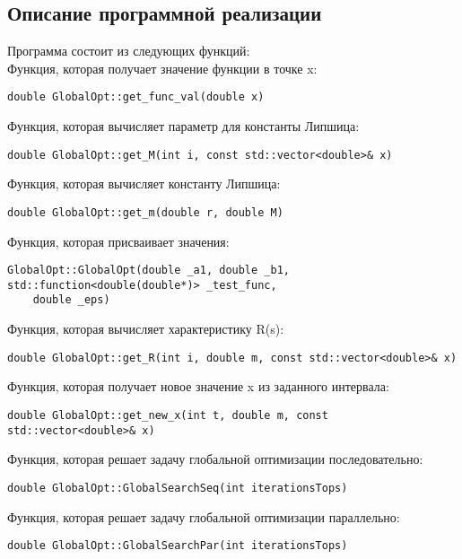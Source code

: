 \documentclass[a4paper]{report}
\begin{document}
\begin{center}
\section*{Описание программной реализации}
\end{center}
\par Программа состоит из следующих функций:\\
Функция, которая получает значение функции в точке x:
\begin{lstlisting}
double GlobalOpt::get_func_val(double x)
\end{lstlisting}
Функция, которая вычисляет параметр для константы Липшица:
\begin{lstlisting}
double GlobalOpt::get_M(int i, const std::vector<double>& x)
\end{lstlisting}
Функция, которая вычисляет константу Липшица:
\begin{lstlisting}
double GlobalOpt::get_m(double r, double M)
\end{lstlisting}
Функция, которая присваивает значения:
\begin{lstlisting}
GlobalOpt::GlobalOpt(double _a1, double _b1, std::function<double(double*)> _test_func,
    double _eps)
\end{lstlisting}
Функция, которая вычисляет характеристику R(s):
\begin{lstlisting}
double GlobalOpt::get_R(int i, double m, const std::vector<double>& x)
\end{lstlisting}
Функция, которая получает новое значение x из заданного интервала:
\begin{lstlisting}
double GlobalOpt::get_new_x(int t, double m, const std::vector<double>& x)
\end{lstlisting}
Функция, которая решает задачу глобальной оптимизации последовательно:
\begin{lstlisting}
double GlobalOpt::GlobalSearchSeq(int iterationsTops)
\end{lstlisting}
Функция, которая решает задачу глобальной оптимизации параллельно:
\begin{lstlisting}
double GlobalOpt::GlobalSearchPar(int iterationsTops)
\end{lstlisting}
\newpage
\end{document}
